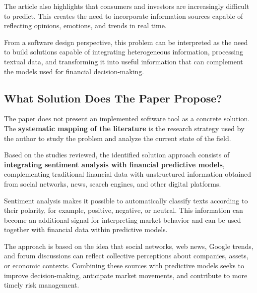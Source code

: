 \vspace{2mm}

The article also highlights that consumers and investors are increasingly difficult to predict. This creates the need to incorporate information sources capable of reflecting opinions, emotions, and trends in real time.

\vspace{2mm}

From a software design perspective, this problem can be interpreted as the need to build solutions capable of integrating heterogeneous information, processing textual data, and transforming it into useful information that can complement the models used for financial decision-making.


\subsection{What Solution Does The Paper Propose?}
\vspace{2mm}

The paper does not present an implemented software tool as a concrete solution. The \textbf{systematic mapping of the literature} is the research strategy used by the author to study the problem and analyze the current state of the field.

\vspace{2mm}

Based on the studies reviewed, the identified solution approach consists of \textbf{integrating sentiment analysis with financial predictive models}, complementing traditional financial data with unstructured information obtained from social networks, news, search engines, and other digital platforms.

\vspace{2mm}

Sentiment analysis makes it possible to automatically classify texts according to their polarity, for example, positive, negative, or neutral. This information can become an additional signal for interpreting market behavior and can be used together with financial data within predictive models.

\vspace{2mm}

The approach is based on the idea that social networks, web news, Google trends, and forum discussions can reflect collective perceptions about companies, assets, or economic contexts. Combining these sources with predictive models seeks to improve decision-making, anticipate market movements, and contribute to more timely risk management.

